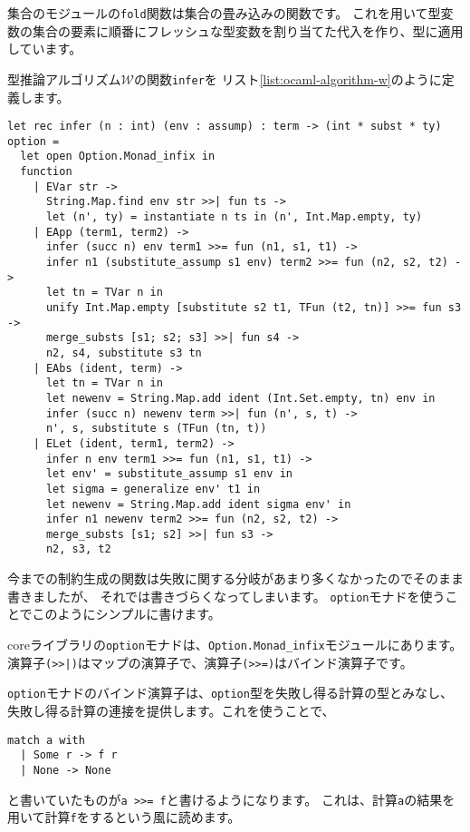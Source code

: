 集合のモジュールの\texttt{fold}関数は集合の畳み込みの関数です。
これを用いて型変数の集合の要素に順番にフレッシュな型変数を割り当てた代入を作り、型に適用しています。

型推論アルゴリズム$\mathcal W$の関数\texttt{infer}を
リスト\ref{list:ocaml-algorithm-w}のように定義します。

\begin{lstlisting}[caption=型推論アルゴリズム$\mathcal W$の実装, label=list:ocaml-algorithm-w]
let rec infer (n : int) (env : assump) : term -> (int * subst * ty) option =
  let open Option.Monad_infix in
  function
    | EVar str ->
      String.Map.find env str >>| fun ts ->
      let (n', ty) = instantiate n ts in (n', Int.Map.empty, ty)
    | EApp (term1, term2) ->
      infer (succ n) env term1 >>= fun (n1, s1, t1) ->
      infer n1 (substitute_assump s1 env) term2 >>= fun (n2, s2, t2) ->
      let tn = TVar n in
      unify Int.Map.empty [substitute s2 t1, TFun (t2, tn)] >>= fun s3 ->
      merge_substs [s1; s2; s3] >>| fun s4 ->
      n2, s4, substitute s3 tn
    | EAbs (ident, term) ->
      let tn = TVar n in
      let newenv = String.Map.add ident (Int.Set.empty, tn) env in
      infer (succ n) newenv term >>| fun (n', s, t) ->
      n', s, substitute s (TFun (tn, t))
    | ELet (ident, term1, term2) ->
      infer n env term1 >>= fun (n1, s1, t1) ->
      let env' = substitute_assump s1 env in
      let sigma = generalize env' t1 in
      let newenv = String.Map.add ident sigma env' in
      infer n1 newenv term2 >>= fun (n2, s2, t2) ->
      merge_substs [s1; s2] >>| fun s3 ->
      n2, s3, t2
\end{lstlisting}

今までの制約生成の関数は失敗に関する分岐があまり多くなかったのでそのまま書きましたが、
それでは書きづらくなってしまいます。
\texttt{option}モナドを使うことでこのようにシンプルに書けます。

coreライブラリの\texttt{option}モナドは、\texttt{Option.Monad\_infix}モジュールにあります。
演算子\texttt{(>>|)}はマップの演算子で、演算子\texttt{(>>=)}はバインド演算子です。

\texttt{option}モナドのバインド演算子は、\texttt{option}型を失敗し得る計算の型とみなし、
失敗し得る計算の連接を提供します。これを使うことで、
\begin{lstlisting}
match a with
  | Some r -> f r
  | None -> None
\end{lstlisting}
と書いていたものが\texttt{a >>= f}と書けるようになります。
これは、計算\texttt{a}の結果を用いて計算\texttt{f}をするという風に読めます。

